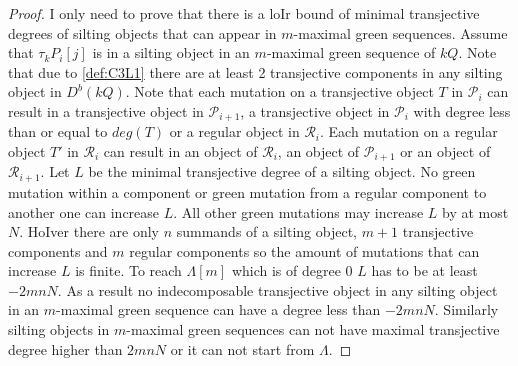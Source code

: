 \begin{proof}
\indent I only need to prove that there is a loIr bound of minimal transjective degrees of silting objects that can appear in $m$-maximal green sequences. Assume that $\tau_kP_i[j]$ is in a silting object in an $m$-maximal green sequence of $kQ$. Note that due to \ref{def:C3L1} there are at least 2 transjective components in any silting object in $D^b(kQ)$. Note that each mutation on a transjective object $T$ in $\mathcal{P}_i$ can result in a transjective object in $\mathcal{P}_{i+1}$, a transjective object in $\mathcal{P}_i$ with degree less than or equal to $deg(T)$ or a regular object in $\mathcal{R}_i$. Each mutation on a regular object $T'$ in $\mathcal{R}_i$ can result in an object of $\mathcal{R}_i$, an object of $\mathcal{P}_{i+1}$ or an object of $\mathcal{R}_{i+1}$. Let $L$ be the minimal transjective degree of a silting object. No green mutation within a component or green mutation from a regular component to another one can increase $L$. All other green mutations may increase $L$ by at most $N$. HoIver there are only $n$ summands of a silting object, $m+1$ transjective components and $m$ regular components so the amount of mutations that can increase $L$ is finite. To reach $\Lambda[m]$ which is of degree 0 $L$ has to be at least $-2mnN$. As a result no indecomposable transjective object in any silting object in an $m$-maximal green sequence can have a degree less than $-2mnN$. Similarly silting objects in $m$-maximal green sequences can not have maximal transjective degree higher than $2mnN$ or it can not start from $\Lambda$.
\end{proof}
